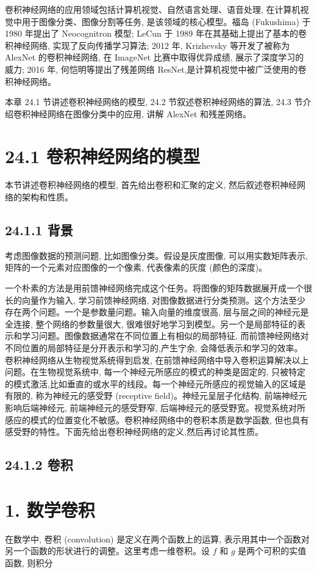 \documentclass[10pt]{article}
\begin{document}
\begin{CJK*}{UTF8}{bsmi}
卷积神经网络的应用领域包括计算机视觉、自然语言处理、语音处理, 在计算机视觉中用于图像分类、图像分割等任务, 是该领域的核心模型。福岛 (Fukushima) 于 1980 年提出了 Neocognitron 模型; LeCun 于 1989 年在其基础上提出了基本的卷积神经网络, 实现了反向传播学习算法; 2012 年, Krizhevsky 等开发了被称为 AlexNet 的卷积神经网络, 在 ImageNet 比赛中取得优异成绩, 展示了深度学习的威力; 2016 年, 何恺明等提出了残差网络 ResNet,是计算机视觉中被广泛使用的卷积神经网络。

本章 24.1 节讲述卷积神经网络的模型, 24.2 节叙述卷积神经网络的算法, 24.3 节介绍卷积神经网络在图像分类中的应用, 讲解 AlexNet 和残差网络。

\section*{24.1 卷积神经网络的模型}
本节讲述卷积神经网络的模型, 首先给出卷积和汇聚的定义, 然后叙述卷积神经网络的架构和性质。

\subsection*{24.1.1 背景}
考虑图像数据的预测问题, 比如图像分类。假设是灰度图像, 可以用实数矩阵表示, 矩阵的一个元素对应图像的一个像素, 代表像素的灰度 (颜色的深度)。

一个朴素的方法是用前馈神经网络完成这个任务。将图像的矩阵数据展开成一个很长的向量作为输入, 学习前馈神经网络, 对图像数据进行分类预测。这个方法至少存在两个问题。一个是参数量问题。输入向量的维度很高, 层与层之间的神经元是全连接, 整个网络的参数量很大, 很难很好地学习到模型。另一个是局部特征的表示和学习问题。图像数据通常在不同位置上有相似的局部特征, 而前馈神经网络对不同位置的局部特征是分开表示和学习的,产生㝋余, 会降低表示和学习的效率。\\
卷积神经网络从生物视觉系统得到启发, 在前馈神经网络中导入卷积运算解决以上问题。在生物视觉系统中, 每一个神经元所感应的模式的种类是固定的, 只被特定的模式激活,比如垂直的或水平的线段。每一个神经元所感应的视觉输入的区域是有限的, 称为神经元的感受野 (receptive field)。神经元呈层子化结构, 前端神经元影响后端神经元, 前端神经元的感受野窄, 后端神经元的感受野宽。视觉系统对所感应的模式的位置变化不敏感。卷积神经网络中的卷积本质是数学函数, 但也具有感受野的特性。下面先给出卷积神经网络的定义,然后再讨论其性质。

\subsection*{24.1.2 卷积}
\section*{1. 数学卷积}
在数学中, 卷积 (convolution) 是定义在两个函数上的运算, 表示用其中一个函数对另一个函数的形状进行的调整。这里考虑一维卷积。设 $f$ 和 $g$ 是两个可积的实值函数, 则积分


\end{CJK*}
\end{document}
